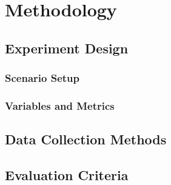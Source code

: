 
\chapter{Methodology} %

\label{Chapter4} %


\section{Experiment Design}



\subsection{Scenario Setup}




\subsection{Variables and Metrics}



\section{Data Collection Methods}





\section{Evaluation Criteria}


